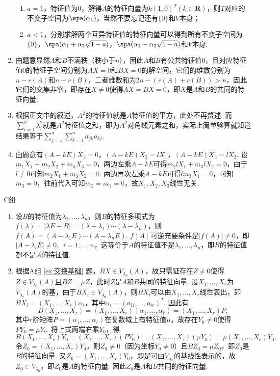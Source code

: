 \begin{enumerate}
\begin{enumerate}
              \item $a=1$，特征值为0，解得$A$的特征向量为$k(1,0)^T(k\in\mathbf{R})$，则$T$对应的不变子空间为$\spa(\alpha_1)$，当然不要忘记还有$\{0\}$和$V$本身；

              \item $a<1$，分别求解两个互异特征值的特征向量可以得到所有不变子空间为$\{0\}$，$\spa(\alpha_1+\alpha_2\sqrt{1-a})$，$\spa(\alpha_1-\alpha_2\sqrt{1-a})$和$V$本身.
          \end{enumerate}

    \item 由题意显然$A$和$B$不满秩（秩小于$n$），因此$A$和$B$有公共特征值0，且对应特征值0的特征子空间分别为$AX=0$和$BX=0$的解空间，它们的维数分别为$n-r(A)$和$n-r(B)$，二者维数和为$2n-(r(A)+r(B))>n$，因此它们的交集非零，即存在$X\neq 0$使得$AX=BX=0$，即$X$是$A$和$B$的共同的特征向量.

    \item 根据正文中的叙述，$A^2$的特征值就是$A$特征值的平方，此处不再赘述. 而$\displaystyle\sum_{i=1}^{n}\lambda_i^2$就是$A^2$特征值之和，即为$A^2$对角线元素之和，实际上简单验算就知道结果等于$\displaystyle\sum_{j=1}^{n}\sum_{k=1}^{n}a_{jk}a_{kj}$.

    \item 由题意有$(A-kE)X_1=0$，$(A-kE)X_2=lX_1$，$(A-kE)X_3=lX_2$. 设$m_1X_1+m_2X_2+m_3X_3=0$，两边左乘$A-kE$可得$m_2lX_1+m_3lX_2=0$，由于$l\neq 0$可知$m_2X_1+m_3X_2=0$. 两边再次左乘$A-kE$可得$lm_3X_1=0$，可知$m_3=0$，往前代入可知$m_2=m_1=0$，故$X_1,X_2,X_3$线性无关.
\end{enumerate}

\centerline{\heiti C组}
\begin{enumerate}
    \item 设$B$的特征值为$\lambda_1,\ldots,\lambda_n$，则$B$的特征多项式为$f(\lambda)=|\lambda E-B|=(\lambda-\lambda_1)\cdots(\lambda-\lambda_n)$，则$f(A)=(A-\lambda_1E)\cdots(A-\lambda_nE)$. $f(A)$可逆充要条件是$|f(A)|\neq 0$，即$|A-\lambda_iE|\neq 0,\enspace i=1,\ldots,n$，这等价于$A$的特征值不是$\lambda_1,\ldots,\lambda_n$，即$B$的特征值都不是$A$的特征值.

    \item 根据A组 \ref*{ex:交换基础} 题，$BX\in V_{\lambda_0}(A)$，故只需证存在$Z\neq 0$使得$Z\in V_{\lambda_0}(A)$且$BZ=\mu Z$，此时$Z$是$A$和$B$共同的特征向量. 设$X_1,\ldots,X_r$为$V_{\lambda_0}(A)$的基，由于$BX_i\in V_{\lambda_0}(A)$，则$BX_i$可以由$X_1,\ldots,X_r$线性表出，即$BX_i=(X_1,\ldots,X_r)\alpha_i$，其中$\alpha_i=(a_{i1},\ldots,a_{ir})^T$. 因此有
          \[B(X_1,\ldots,X_r)=(X_1,\ldots,X_r)(\alpha_1,\ldots,\alpha_r)=(X_1,\ldots,X_r)P,\]
          其中$r$阶矩阵$P=(\alpha_1,\ldots,\alpha_r)$在复数域上有特征值$\mu$，故存在$Y_0\neq 0$使得$PY_0=\mu Y_0$. 将上式两端右乘$Y_0$，得
          \[B(X_1,\ldots,X_r)Y_0=(X_1,\ldots,X_r)(PY_0)=(X_1,\ldots,X_r)(\mu Y_0)=\mu(X_1,\ldots,X_r)Y_0.\]
          令$Z_0=(X_1,\ldots,X_r)Y_0$，则$Z_0\neq 0$（因为坐标$Y_0\neq 0$）且$BZ_0=\mu Z_0$，即$Z_0$是$B$的特征向量. 又$Z_0=(X_1,\ldots,X_r)Y_0$，即是可由$V_{\lambda_0}$的基线性表示的，故$Z_0\in V_{\lambda_0}$，即$Z_0$是$A$的特征向量. 因此$Z_0$是$A$和$B$共同的特征向量.
\end{enumerate}

\clearpage
